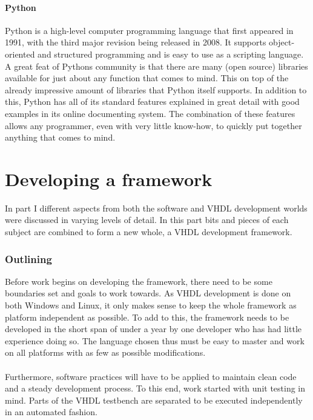 \documentclass[11pt,british]{article}
\begin{document}
\subsection{Python}
Python is a high-level computer programming language that first appeared in 1991, with the third major revision being released in 2008. It supports object-oriented and structured programming and is easy to use as a scripting language. A great feat of Pythons community is that there are many (open source) libraries available for just about any function that comes to mind. This on top of the already impressive amount of libraries that Python itself supports. In addition to this, Python has all of its standard features explained in great detail with good examples in its online documenting system. The combination of these features allows any programmer, even with very little know-how, to quickly put together anything that comes to mind.


\newpage
\part{Developing a framework}
In part I different aspects from both the software and \gls{VHDL} development worlds were discussed in  varying levels of detail. In this part bits and pieces of each subject are combined to form a new whole, a VHDL development framework.

\section{Outlining}
\label{sec:outlining}
Before work begins on developing the framework, there need to be some boundaries set and goals to work towards. As VHDL development is done on both Windows and Linux, it only makes sense to keep the whole framework as platform independent as possible. To add to this, the framework needs to be developed in the short span of under a year by one developer who has had little experience doing so. The language chosen thus must be easy to master and work on all platforms with as few as possible modifications.\\
\\
Furthermore, software practices will have to be applied to maintain clean code and a steady development process. To this end, work started with unit testing in mind. Parts of the VHDL testbench are separated to be executed independently in an automated fashion.
\end{document}
